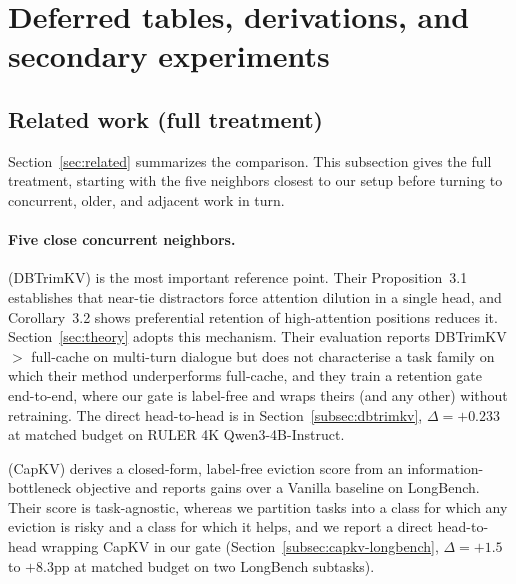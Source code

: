 \appendix

\section{Deferred tables, derivations, and secondary experiments}
\label{app:deferred}


\subsection{Related work (full treatment)}

Section~\ref{sec:related} summarizes the comparison. This subsection gives
the full treatment, starting with the five neighbors closest to our setup
before turning to concurrent, older, and adjacent work in turn.

\paragraph{Five close concurrent neighbors.}
\citet{arxiv260509649} (DBTrimKV) is the most important reference point.
Their Proposition~3.1 establishes that near-tie distractors force attention
dilution in a single head, and Corollary~3.2 shows preferential retention of
high-attention positions reduces it. Section~\ref{sec:theory} adopts this
mechanism. Their evaluation reports DBTrimKV $>$ full-cache on multi-turn
dialogue but does not characterise a task family on which their method
underperforms full-cache, and they train a retention gate end-to-end, where
our gate is label-free and wraps theirs (and any other) without retraining.
The direct head-to-head is in Section~\ref{subsec:dbtrimkv},
$\Delta = +0.233$ at matched budget on RULER 4K Qwen3-4B-Instruct.

\citet{arxiv260425975} (CapKV) derives a closed-form, label-free eviction
score from an information-bottleneck objective and reports gains over a
Vanilla baseline on LongBench. Their score is task-agnostic, whereas we
partition tasks into a class for which any eviction is risky and a class
for which it helps, and we report a direct head-to-head wrapping CapKV in
our gate (Section~\ref{subsec:capkv-longbench}, $\Delta = +1.5$ to
$+8.3$pp at matched budget on two LongBench subtasks).

